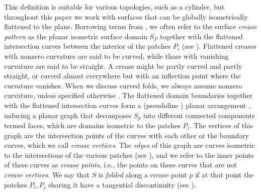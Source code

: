 This definition is suitable for various topologies, such as a cylinder, but throughout this paper we work with surfaces that can be globally isometrically flattened to the plane. Borrowing terms from \cite{origami_book,non_pleated}, we often refer to the surface \emph{crease pattern} as the planar isometric surface domain $S_P$ together with the flattened intersection curves between the interior  of the patches $P_i$ (see ).  Flattened creases with nonzero curvature are said to be curved, while those with vanishing curvature are said to be straight. A crease might be partly curved and partly straight, or curved almost everywhere but with an inflection point where the curvature vanishes. When we discuss curved folds, we always assume nonzero curvature, unless specified otherwise . The flattened domain boundaries together with the flattened intersection curves form a (pseudoline ) planar arrangement \cite{arrangements}, inducing a planar graph that decomposes $S_p$ into different connected components termed faces, which are domains isometric to the patches $P_i$. The vertices of this graph are the intersection points of the curves with each other or the boundary curves, which we call \emph{crease vertices}. The \emph{edges} of this graph are curves isometric to the intersections of the various patches (see ), and we refer to the inner points of these curves as \emph{crease points}, i.e., the points on these curves that are not \textit{crease vertices}. We say that $S$ is \emph{folded} along a crease point $p$ if at that point the patches $P_i,P_j$ sharing it have a tangential discontinuity  (see ).

